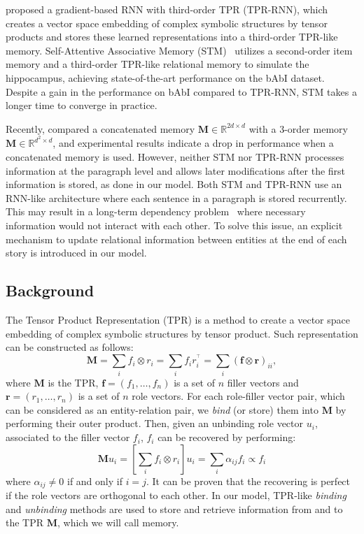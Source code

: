 \documentclass[letterpaper]{article} \usepackage{aaai22}  \usepackage{times}  \usepackage{helvet}  \usepackage{courier}  \usepackage[hyphens]{url}  \usepackage{graphicx} \urlstyle{rm} \def\UrlFont{\rm}  \usepackage{natbib}  \usepackage{caption} \DeclareCaptionStyle{ruled}{labelfont=normalfont,labelsep=colon,strut=off} \frenchspacing  \setlength{\pdfpagewidth}{8.5in}  \setlength{\pdfpageheight}{11in}  \usepackage{algorithm}
\begin{document}
\citet{schlag2018learning} proposed a gradient-based RNN with third-order TPR (TPR-RNN), which creates a vector space embedding of complex symbolic structures by tensor products and stores these learned representations into a third-order TPR-like memory. 
Self-Attentive Associative Memory (STM)~\cite{le2020self} utilizes a second-order item memory and a third-order TPR-like relational memory to simulate the hippocampus, achieving state-of-the-art performance on the bAbI dataset.
Despite a gain in the performance on bAbI compared to TPR-RNN, STM takes a longer time to converge in practice.

Recently, \citet{schlag2020learning} compared a concatenated memory $\boldsymbol{M} \in \mathbb{R}^{2d \times d}$ with a 3-order memory $\boldsymbol{M} \in \mathbb{R}^{d^{2} \times d}$, and experimental results indicate a drop in performance when a concatenated memory is used. 
However, neither STM nor TPR-RNN processes information at the paragraph level and allows later modifications after the first information is stored, as done in our model. 
Both STM and TPR-RNN use an RNN-like architecture where each sentence in a paragraph is stored recurrently. This may result in a long-term dependency problem~\cite{vaswani2017attention} where necessary information would not interact with each other. 
To solve this issue, an explicit mechanism to update relational information between entities at the end of each story
is introduced in our model.
 \subsection{Background}

The Tensor Product Representation (TPR) is a method to create a vector space embedding of complex symbolic structures by tensor product. 
Such representation can be constructed as follows:
\begin{equation}\boldsymbol{M}=\sum_{i} f_i\otimes r_i= \sum_{i} f_i r_i^{^\top} = \sum_{i} (\boldsymbol{f} \otimes \boldsymbol{r})_{ii},
\end{equation}
where $\boldsymbol{M}$ is the TPR, $\boldsymbol{f} = (f_1,\dots,f_n)$ is a set of $n$ filler vectors and $\boldsymbol{r} = (r_1,\dots,r_n)$ is a set of $n$ role vectors. 
For each role-filler vector pair, which can be considered as an entity-relation pair, we \textit{bind} (or store) them into $\boldsymbol{M}$ by performing their outer product. 
Then, given an unbinding role vector $u_i$,
associated to the filler vector $f_i$, $f_i$ can be recovered by performing:
\begin{equation}\boldsymbol{M} u_i= \left[ \sum_{i} f_i\otimes r_i \right] u_i = \sum_{i} \alpha_{ij} f_i \propto f_i
\end{equation}
where $\alpha_{ij}\neq0$ if and only if $i=j$. It can be proven that the recovering is perfect if the role vectors are orthogonal to each other.
In our model, TPR-like \textit{binding}  and \textit{unbinding} methods are used to store and retrieve information from and to the TPR $\boldsymbol{M}$, which we will call memory.
 
\end{document}
